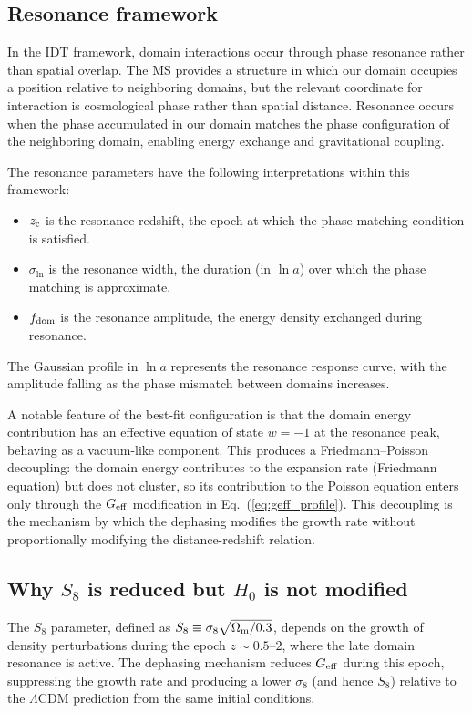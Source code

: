 \documentclass[aps,prd,twocolumn,superscriptaddress,nofootinbib]{revtex4-2}
\newcommand{\Om}{\Omega_{\rm m}}
\newcommand{\fdom}{f_{\rm dom}}
\newcommand{\zc}{z_{\rm c}}
\newcommand{\sln}{\sigma_{\ln}}
\newcommand{\Geff}{G_{\rm eff}}
\newcommand{\Hubble}{H_0}
\begin{document}
\subsection{Resonance framework}
\label{sec:resonance_framework}

In the IDT framework, domain interactions occur through phase
resonance rather than spatial overlap. The MS provides a structure in
which our domain occupies a position relative to neighboring domains,
but the relevant coordinate for interaction is cosmological phase
rather than spatial distance. Resonance occurs when the phase
accumulated in our domain matches the phase configuration of the
neighboring domain, enabling energy exchange and gravitational
coupling.

The resonance parameters have the following interpretations within
this framework:
\begin{itemize}
\item $\zc$ is the resonance redshift, the epoch at which the phase
  matching condition is satisfied.
\item $\sln$ is the resonance width, the duration (in $\ln a$) over
  which the phase matching is approximate.
\item $\fdom$ is the resonance amplitude, the energy density exchanged
  during resonance.
\end{itemize}
The Gaussian profile in $\ln a$ represents the resonance response
curve, with the amplitude falling as the phase mismatch between
domains increases.

A notable feature of the best-fit configuration is that the domain
energy contribution has an effective equation of state $w = -1$ at the
resonance peak, behaving as a vacuum-like component. This produces a
Friedmann--Poisson decoupling: the domain energy contributes to the
expansion rate (Friedmann equation) but does not cluster, so its
contribution to the Poisson equation enters only through the
$\Geff$ modification in Eq.~(\ref{eq:geff_profile}). This decoupling
is the mechanism by which the dephasing modifies the growth rate
without proportionally modifying the distance-redshift relation.

\subsection{Why $S_8$ is reduced but $\Hubble$ is not modified}
\label{sec:s8_vs_h0}

The $S_8$ parameter, defined as $S_8 \equiv \sigma_8
\sqrt{\Om/0.3}$, depends on the growth of density perturbations
during the epoch $z \sim 0.5$--$2$, where the late domain resonance
is active. The dephasing mechanism reduces $\Geff$ during this epoch,
suppressing the growth rate and producing a lower $\sigma_8$ (and
hence $S_8$) relative to the $\Lambda$CDM prediction from the same
initial conditions.
\end{document}
